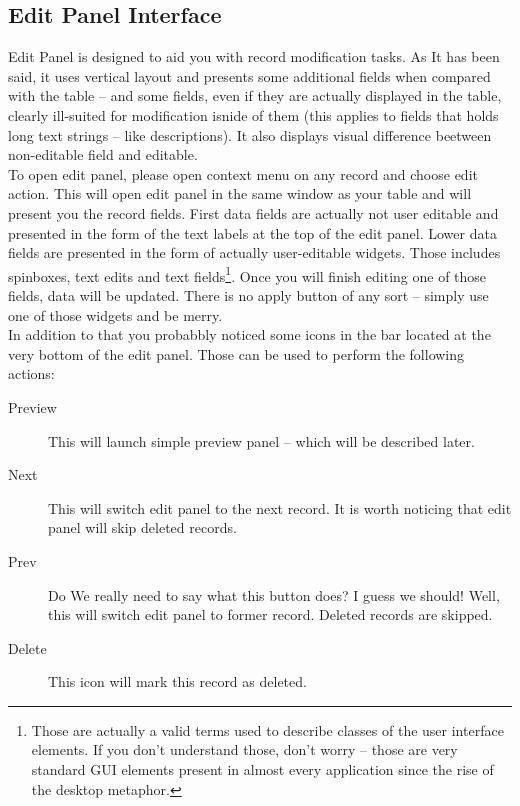 \subsection{Edit Panel Interface}
Edit Panel is designed to aid you with record modification tasks. As It has been said, it uses vertical layout and presents some additional fields when compared with the table -- and some fields, even if they are actually displayed in the table, clearly ill-suited for modification isnide of them (this applies to fields that holds long text strings -- like descriptions). It also displays visual difference beetween non-editable field and editable.\\
To open edit panel, please open context menu on any record and choose edit action. This will open edit panel in the same window as your table and will present you the record fields. First data fields are actually not user editable and presented in the form of the text labels at the top of the edit panel. Lower data fields are presented in the form of actually user-editable widgets. Those includes spinboxes, text edits and text fields\footnote{Those are actually a valid terms used to describe classes of the user interface elements. If you don't understand those, don't worry -- those are very standard {GUI} elements present in almost every application since the rise of the desktop metaphor.}. Once you will finish editing one of those fields, data will be updated. There is no apply button of any sort -- simply use one of those widgets and be merry.\\
In addition to that you probabbly noticed some icons in the bar located at the very bottom of the edit panel. Those can be used to perform the following actions:

\begin{description}
  \item[Preview] This will launch simple preview panel -- which will be described later.
  \item[Next] This will switch edit panel to the next record. It is worth noticing that edit panel will skip deleted records.
  \item[Prev] Do We really need to say what this button does? I guess we should! Well, this will switch edit panel to former record. Deleted records are skipped.
  \item[Delete] This icon will mark this record as deleted.
\end{description}

